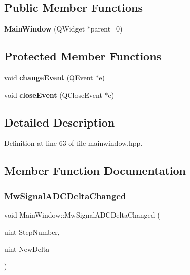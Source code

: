 \subsection*{Public Member Functions}
\begin{DoxyCompactItemize}
\item 
\mbox{\label{class_main_window_a8b244be8b7b7db1b08de2a2acb9409db}} 
{\bfseries Main\+Window} (Q\+Widget $\ast$parent=0)
\end{DoxyCompactItemize}
\subsection*{Protected Member Functions}
\begin{DoxyCompactItemize}
\item 
\mbox{\label{class_main_window_af4ca5d0d3d18ddcb7d54b6596bbf4797}} 
void {\bfseries change\+Event} (Q\+Event $\ast$e)
\item 
\mbox{\label{class_main_window_a8a5bf36f9544ed3ec3a9eea9b7154564}} 
void {\bfseries close\+Event} (Q\+Close\+Event $\ast$e)
\end{DoxyCompactItemize}


\subsection{Detailed Description}


Definition at line 63 of file mainwindow.\+hpp.



\subsection{Member Function Documentation}
\mbox{\label{class_main_window_a37ea64ccb9b5bcf9bb976602d42aadfa}} 
\subsubsection{\texorpdfstring{Mw\+Signal\+A\+D\+C\+Delta\+Changed}{MwSignalADCDeltaChanged}}
{\footnotesize\ttfamily void Main\+Window\+::\+Mw\+Signal\+A\+D\+C\+Delta\+Changed (\begin{DoxyParamCaption}\item[{uint}]{Step\+Number,  }\item[{uint}]{New\+Delta }\end{DoxyParamCaption})\hspace{0.3cm}{\ttfamily [signal]}}



